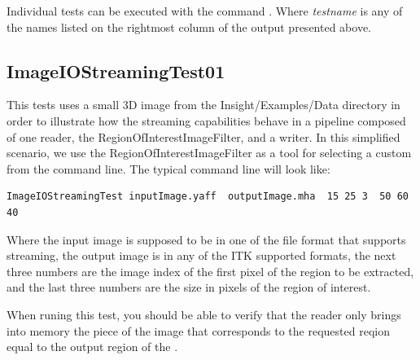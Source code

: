 \documentclass{InsightArticle}
\begin{document}
Individual tests can be executed with the command .
Where \emph{testname} is any of the names listed on the rightmost column of the
output presented above.

\subsection{ImageIOStreamingTest01}
This tests uses a small 3D image from the Insight/Examples/Data directory in
order to illustrate how the streaming capabilities behave in a pipeline
composed of one reader, the RegionOfInterestImageFilter, and a writer.  In this
simplified scenario, we use the RegionOfInterestImageFilter as a tool for
selecting a custom  from the command line. The typical 
command line will look like:

\begin{verbatim}
ImageIOStreamingTest inputImage.yaff  outputImage.mha  15 25 3  50 60 40
\end{verbatim}

Where the input image is supposed to be in one of the file format that supports
streaming, the output image is in any of the ITK supported formats, the next three 
numbers are the image index of the first pixel of the region to be extracted, and 
the last three numbers are the size in pixels of the region of interest.

When runing this test, you should be able to verify that the reader only brings
into memory the piece of the image that corresponds to the requested reqion
equal to the output region of the .


%
%



\end{document}
